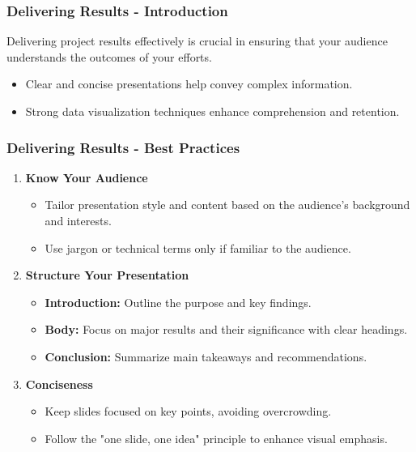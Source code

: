 \documentclass[aspectratio=169]{beamer}
\begin{document}
\begin{frame}[fragile]
    \frametitle{Delivering Results - Introduction}
    Delivering project results effectively is crucial in ensuring that your audience understands the outcomes of your efforts. 
    \begin{itemize}
        \item Clear and concise presentations help convey complex information.
        \item Strong data visualization techniques enhance comprehension and retention.
    \end{itemize}
\end{frame}

\begin{frame}[fragile]
    \frametitle{Delivering Results - Best Practices}
    \begin{enumerate}
        \item \textbf{Know Your Audience}
            \begin{itemize}
                \item Tailor presentation style and content based on the audience's background and interests.
                \item Use jargon or technical terms only if familiar to the audience.
            \end{itemize}
        \item \textbf{Structure Your Presentation}
            \begin{itemize}
                \item \textbf{Introduction:} Outline the purpose and key findings.
                \item \textbf{Body:} Focus on major results and their significance with clear headings.
                \item \textbf{Conclusion:} Summarize main takeaways and recommendations.
            \end{itemize}
        \item \textbf{Conciseness}
            \begin{itemize}
                \item Keep slides focused on key points, avoiding overcrowding.
                \item Follow the "one slide, one idea" principle to enhance visual emphasis.
            \end{itemize}
    \end{enumerate}
\end{frame}
\end{document}
